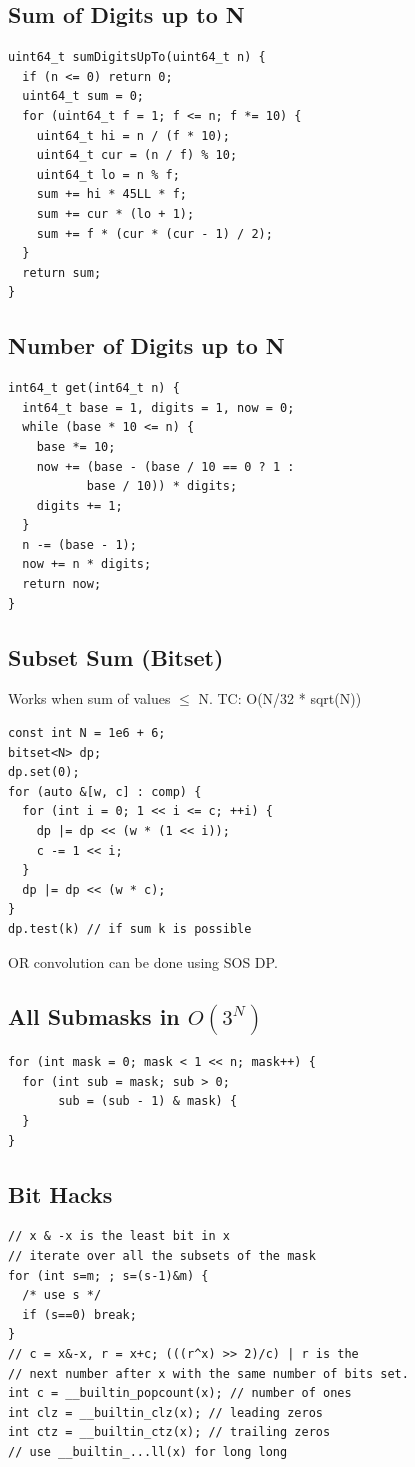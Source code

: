 \subsection{Sum of Digits up to N}
\begin{verbatim}
uint64_t sumDigitsUpTo(uint64_t n) {
  if (n <= 0) return 0;
  uint64_t sum = 0;
  for (uint64_t f = 1; f <= n; f *= 10) {
    uint64_t hi = n / (f * 10);
    uint64_t cur = (n / f) % 10;
    uint64_t lo = n % f;
    sum += hi * 45LL * f;
    sum += cur * (lo + 1);
    sum += f * (cur * (cur - 1) / 2);
  }
  return sum;
}
\end{verbatim}
\subsection{Number of Digits up to N}
\begin{verbatim}
int64_t get(int64_t n) {
  int64_t base = 1, digits = 1, now = 0;
  while (base * 10 <= n) {
    base *= 10;
    now += (base - (base / 10 == 0 ? 1 :
           base / 10)) * digits;
    digits += 1;
  }
  n -= (base - 1);
  now += n * digits;
  return now;
}
\end{verbatim}
\subsection{Subset Sum (Bitset)}
Works when sum of values $\le$ N. TC: O(N/32 * sqrt(N))
\begin{verbatim}
const int N = 1e6 + 6;
bitset<N> dp;
dp.set(0);
for (auto &[w, c] : comp) {
  for (int i = 0; 1 << i <= c; ++i) {
    dp |= dp << (w * (1 << i));
    c -= 1 << i;
  }
  dp |= dp << (w * c);
}
dp.test(k) // if sum k is possible
\end{verbatim}

OR convolution can be done using SOS DP.

\subsection{All Submasks in $O(3^N)$}
\begin{verbatim}
for (int mask = 0; mask < 1 << n; mask++) {
  for (int sub = mask; sub > 0;
       sub = (sub - 1) & mask) {
  }
}
\end{verbatim}
\subsection{Bit Hacks}
\begin{verbatim}
// x & -x is the least bit in x
// iterate over all the subsets of the mask
for (int s=m; ; s=(s-1)&m) {
  /* use s */
  if (s==0) break;
}
// c = x&-x, r = x+c; (((r^x) >> 2)/c) | r is the
// next number after x with the same number of bits set.
int c = __builtin_popcount(x); // number of ones
int clz = __builtin_clz(x); // leading zeros
int ctz = __builtin_ctz(x); // trailing zeros
// use __builtin_...ll(x) for long long
\end{verbatim}
